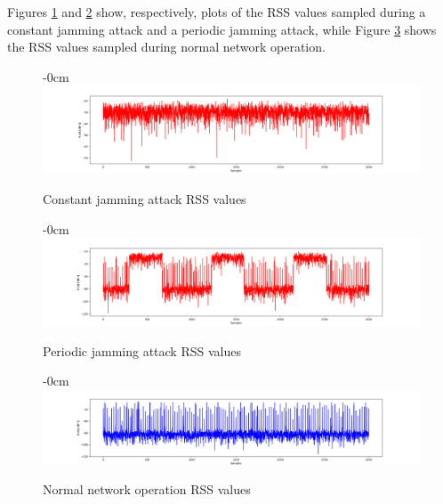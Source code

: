 \documentclass[futureinternet,article,submit,pdftex,moreauthors]{Definitions/mdpi}
\begin{document}
Figures \ref{fig:ConstantJammingSignal} and \ref{fig:PeriodicJammingSignal} show, respectively, plots of the RSS values sampled during a constant jamming attack and a periodic jamming attack, while Figure \ref{fig:normalSignal} shows the RSS values sampled during normal network operation.

\begin{figure}[H]
	\begin{adjustwidth}{-\extralength}{0cm}
	\centering
	\includegraphics[width=21cm]{img/ConstantJammingSignal.png}
	\end{adjustwidth}
	\caption{Constant jamming attack RSS values}\label{fig:ConstantJammingSignal}
\end{figure}  
\unskip
\begin{figure}[H]
	\begin{adjustwidth}{-\extralength}{0cm}
	\centering
	\includegraphics[width=21cm]{img/PeriodicJammingSignal.png}
	\end{adjustwidth}
	\caption{Periodic jamming attack RSS values}\label{fig:PeriodicJammingSignal}
\end{figure}  
\unskip

\begin{figure} [H]
	\begin{adjustwidth}{-\extralength}{0cm}
	\centering
	\includegraphics[width=21cm]{img/NormalSignal.png}
	\end{adjustwidth}
	\caption{Normal network operation RSS values}\label{fig:normalSignal}
\end{figure}
\unskip
\end{document}
